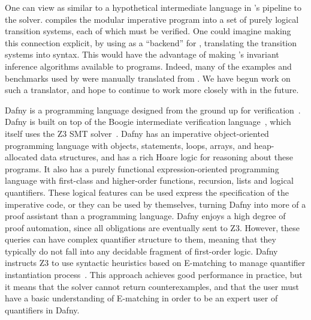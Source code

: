 One can view \mypyvy as similar to a hypothetical intermediate language
in \ivy{}'s pipeline to the solver.
%
\ivy{} compiles the modular imperative program
into a set of purely logical transition systems,
each of which must be verified.
%
One could imagine making this connection explicit,
by using \mypyvy as a ``backend'' for \ivy,
translating the transition systems into \mypyvy syntax.
%
This would have the advantage of making
\mypyvy's invariant inference algorithms available
to \ivy programs.
%
Indeed, many of the examples and benchmarks used by \mypyvy
were manually translated from \ivy.
%
We have begun work on such a translator,
and hope to continue to work more closely with \ivy in the future.


Dafny is a programming language
designed from the ground up for verification~\cite{Leino:LPAR10}.
%
Dafny is built on top of the Boogie intermediate verification language~\cite{boogie-manual},
which itself uses the Z3 SMT solver~\cite{z3}.
%
Dafny has an imperative object-oriented programming language with
objects, statements, loops, arrays, and heap-allocated data structures,
and has a rich Hoare logic for reasoning about these programs.
%
It also has a purely functional expression-oriented programming language
with first-class and higher-order functions, recursion, lists and logical quantifiers.
%
These logical features can be used express the specification of the imperative code,
or they can be used by themselves, turning Dafny into more of a proof assistant
than a programming language.
%
Dafny enjoys a high degree of proof automation, since all obligations are
eventually sent to Z3.
%
However, these queries can have complex quantifier structure to them, meaning
that they typically do not fall into any decidable fragment of first-order logic.
%
Dafny instructs Z3 to use syntactic heuristics based on E-matching
to manage quantifier instantiation process~\cite{z3-e-matching,simplify}.
%
This approach achieves good performance in practice,
but it means that the solver cannot return counterexamples,
and that the user must have a basic understanding of E-matching
in order to be an expert user of quantifiers in Dafny.

